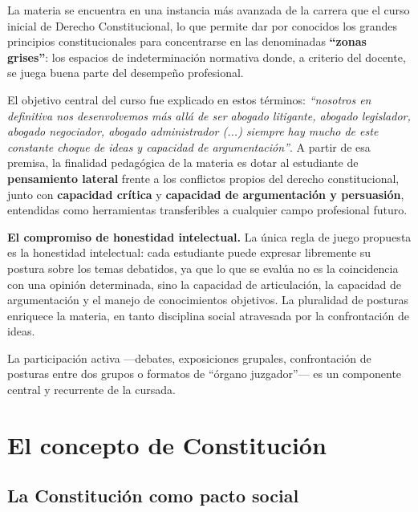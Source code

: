 \documentclass[12pt,oneside]{book}
\begin{document}
La materia se encuentra en una instancia más avanzada de la carrera que el curso inicial de Derecho Constitucional, lo que permite dar por conocidos los grandes principios constitucionales para concentrarse en las denominadas \textbf{``zonas grises''}: los espacios de indeterminación normativa donde, a criterio del docente, se juega buena parte del desempeño profesional.

El objetivo central del curso fue explicado en estos términos: \textit{``nosotros en definitiva nos desenvolvemos más allá de ser abogado litigante, abogado legislador, abogado negociador, abogado administrador (...) siempre hay mucho de este constante choque de ideas y capacidad de argumentación''}. A partir de esa premisa, la finalidad pedagógica de la materia es dotar al estudiante de \textbf{pensamiento lateral} frente a los conflictos propios del derecho constitucional, junto con \textbf{capacidad crítica} y \textbf{capacidad de argumentación y persuasión}, entendidas como herramientas transferibles a cualquier campo profesional futuro.

\begin{important}
\textbf{El compromiso de honestidad intelectual.} La única regla de juego propuesta es la honestidad intelectual: cada estudiante puede expresar libremente su postura sobre los temas debatidos, ya que lo que se evalúa no es la coincidencia con una opinión determinada, sino la capacidad de articulación, la capacidad de argumentación y el manejo de conocimientos objetivos. La pluralidad de posturas enriquece la materia, en tanto disciplina social atravesada por la confrontación de ideas.
\end{important}

La participación activa ---debates, exposiciones grupales, confrontación de posturas entre dos grupos o formatos de ``órgano juzgador''--- es un componente central y recurrente de la cursada.

\chapter[El concepto de Constitución]{El concepto de Constitución}

\section{La Constitución como pacto social}
\end{document}
